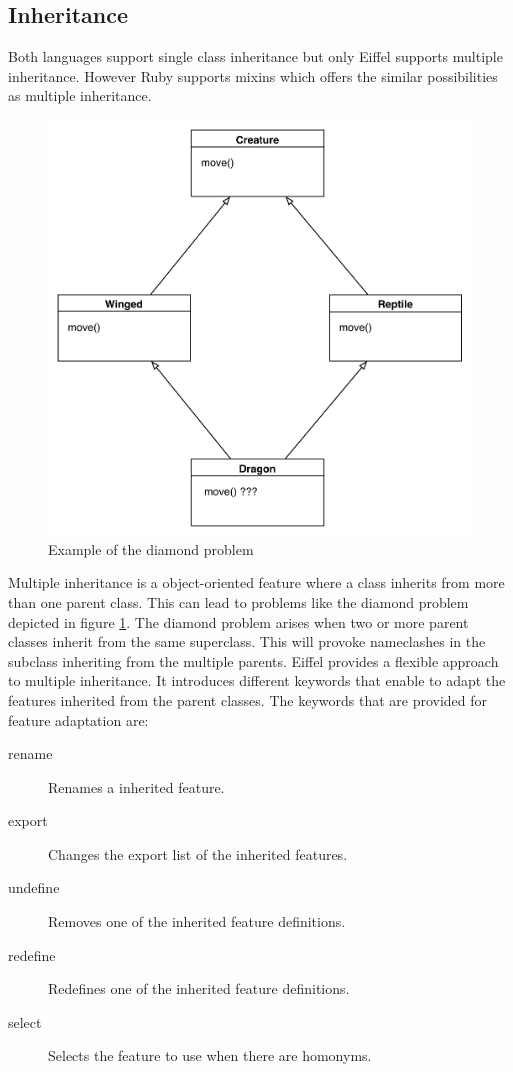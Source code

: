 \documentclass[12pt,a4paper,twocolumn]{article}
\begin{document}
\subsection{Inheritance}
Both languages support single class inheritance but only Eiffel supports multiple inheritance. However Ruby supports mixins which offers the similar possibilities as multiple inheritance.
\begin{figure}[H]
\centering
\includegraphics[scale=0.4]{diamond.pdf}
\caption{Example of the diamond problem}
\label{fig:diamond}
\end{figure}
Multiple inheritance is a object-oriented feature where a class inherits from more than one parent class. This can lead to problems like the diamond problem depicted in figure \ref{fig:diamond}. The diamond problem arises when two or more parent classes inherit from the same superclass. This will provoke nameclashes in the subclass inheriting from the multiple parents. Eiffel provides a flexible approach to multiple inheritance. It introduces different keywords that enable to adapt the features inherited from the parent classes. The keywords that are provided for feature adaptation are:
\begin{description}
\item[rename] Renames a inherited feature.
\item[export] Changes the export list of the inherited features.
\item[undefine] Removes one of the inherited feature definitions.
\item[redefine] Redefines one of the inherited feature definitions.
\item[select] Selects the feature to use when there are homonyms.
\end{description}
\end{document}
